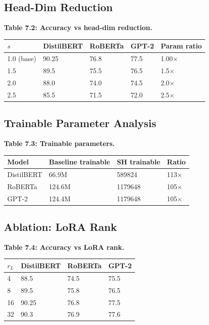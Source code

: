\subsection{Head-Dim Reduction}

\textbf{Table 7.2: Accuracy vs head-dim reduction.}

\begin{table}[H]
\centering
\small
\begin{tabular}{lllll}
\toprule
\textbf{$s$} & \textbf{DistilBERT} & \textbf{RoBERTa} & \textbf{GPT-2} & \textbf{Param ratio} \\
\midrule
1.0 (base) & 90.25 & 76.8 & 77.5 & 1.00$\times$ \\
1.5 & 89.5 & 75.5 & 76.5 & 1.5$\times$ \\
2.0 & 88.0 & 74.0 & 74.5 & 2.0$\times$ \\
2.5 & 85.5 & 71.5 & 72.0 & 2.5$\times$ \\
\bottomrule
\end{tabular}
\end{table}

\subsection{Trainable Parameter Analysis}

\textbf{Table 7.3: Trainable parameters.}

\begin{table}[H]
\centering
\small
\begin{tabular}{llll}
\toprule
\textbf{Model} & \textbf{Baseline trainable} & \textbf{SH trainable} & \textbf{Ratio} \\
\midrule
DistilBERT & 66.9M & 589824 & 113$\times$ \\
RoBERTa & 124.6M & 1179648 & 105$\times$ \\
GPT-2 & 124.4M & 1179648 & 105$\times$ \\
\bottomrule
\end{tabular}
\end{table}

\subsection{Ablation: LoRA Rank}

\textbf{Table 7.4: Accuracy vs LoRA rank.}

\begin{table}[H]
\centering
\small
\begin{tabular}{llll}
\toprule
\textbf{$r_L$} & \textbf{DistilBERT} & \textbf{RoBERTa} & \textbf{GPT-2} \\
\midrule
4 & 88.5 & 74.5 & 75.5 \\
8 & 89.5 & 75.8 & 76.5 \\
16 & 90.25 & 76.8 & 77.5 \\
32 & 90.3 & 76.9 & 77.6 \\
\bottomrule
\end{tabular}
\end{table}

